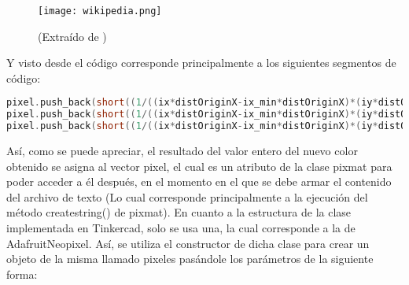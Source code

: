 \documentclass{article}
\begin{document}
\begin{figure}
    \centering
    \texttt{[image: wikipedia.png]}
    \caption{(Extraído de \cite{Wiki_InterpolacionBil})}
    \label{fig:wiki_interpolacionbil}
\end{figure}
Y visto desde el código corresponde principalmente a los siguientes segmentos de código:
\begin{lstlisting}[language=C++, label=code_interpolacionbilineal_part2]
pixel.push_back(short((1/((ix*distOriginX-ix_min*distOriginX)*(iy*distOriginY-iy_min*distOriginY)))*((image_dir.pixelColor(ix_min,iy_min).red()*(ix*distOriginX-(x*dist+dist/2))*(iy*distOriginY-(y*dist+dist/2)))+(image_dir.pixelColor(ix,iy_min).red()*((x*dist+dist/2)-ix_min*distOriginX)*(iy*distOriginY-(y*dist+dist/2)))+(image_dir.pixelColor(ix_min,iy).red()*(ix*distOriginX-(x*dist+dist/2))*((y*dist+dist/2)-iy_min*distOriginY))+(image_dir.pixelColor(ix,iy).red()*((x*dist+dist/2)-ix_min*distOriginX)*((y*dist+dist/2)-iy_min*distOriginY)))));
pixel.push_back(short((1/((ix*distOriginX-ix_min*distOriginX)*(iy*distOriginY-iy_min*distOriginY)))*((image_dir.pixelColor(ix_min,iy_min).green()*(ix*distOriginX-(x*dist+dist/2))*(iy*distOriginY-(y*dist+dist/2)))+(image_dir.pixelColor(ix,iy_min).green()*((x*dist+dist/2)-ix_min*distOriginX)*(iy*distOriginY-(y*dist+dist/2)))+(image_dir.pixelColor(ix_min,iy).green()*(ix*distOriginX-(x*dist+dist/2))*((y*dist+dist/2)-iy_min*distOriginY))+(image_dir.pixelColor(ix,iy).green()*((x*dist+dist/2)-ix_min*distOriginX)*((y*dist+dist/2)-iy_min*distOriginY)))));
pixel.push_back(short((1/((ix*distOriginX-ix_min*distOriginX)*(iy*distOriginY-iy_min*distOriginY)))*((image_dir.pixelColor(ix_min,iy_min).blue()*(ix*distOriginX-(x*dist+dist/2))*(iy*distOriginY-(y*dist+dist/2)))+(image_dir.pixelColor(ix,iy_min).blue()*((x*dist+dist/2)-ix_min*distOriginX)*(iy*distOriginY-(y*dist+dist/2)))+(image_dir.pixelColor(ix_min,iy).blue()*(ix*distOriginX-(x*dist+dist/2))*((y*dist+dist/2)-iy_min*distOriginY))+(image_dir.pixelColor(ix,iy).blue()*((x*dist+dist/2)-ix_min*distOriginX)*((y*dist+dist/2)-iy_min*distOriginY)))));

\end{lstlisting}
Así, como se puede apreciar, el resultado del valor entero del nuevo color obtenido se asigna al vector pixel, el cual es un atributo de la clase pixmat para poder acceder a él después, en el momento en el que se debe armar el contenido del archivo de texto (Lo cual corresponde principalmente a la ejecución del método createstring() de pixmat).
En cuanto a la estructura de la clase implementada en Tinkercad, solo se usa una, la cual corresponde a la de AdafruitNeopixel. Así, se utiliza el constructor de dicha clase para crear un objeto de la misma llamado pixeles pasándole los parámetros de la siguiente forma:
\end{document}

